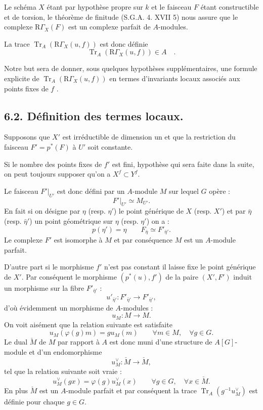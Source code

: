 \documentclass[11pt]{article}
\newcommand{\R}{\mathrm{R}}\newcommand{\RHomCore}{\mathrm{RHom}}
\providecommand{\Tr}{\operatorname{Tr}}
\providecommand{\Tr}{\operatorname{Tr}}
\providecommand{\Tr}{\operatorname{Tr}}
\providecommand{\R}{\mathrm R}
\providecommand{\Tr}{\operatorname{Tr}}
\providecommand{\Tr}{\operatorname{Tr}}
\begin{document}
Le schéma $X$ étant par hypothèse propre sur $k$ et le faisceau $F$ étant constructible et de torsion, le théorème de finitude (S.G.A. 4. XVII 5) nous assure que le complexe $\R\Gamma_X(F)$ est un complexe parfait de $A$-modules.

La trace $\Tr_A(\R\Gamma_X(u, f))$ est donc définie
\[
\Tr_A(\R\Gamma_X(u, f)) \in A \quad .
\]

Notre but sera de donner, sous quelques hypothèses supplémentaires, une formule explicite de $\Tr_A(\R\Gamma_X(u, f))$ en termes d'invariants locaux associés aux points fixes de $f$ .

\bigskip

\subsection*{6.2. Définition des termes locaux.}
Supposons que $X'$ est irréductible de dimension un et que la restriction du faisceau $F'=p^*(F)$ à $U'$ soit constante.

Si le nombre des points fixes de $f'$ est fini, hypothèse qui sera faite dans la suite, on peut toujours supposer qu'on a $X^f \subset Y^f$.

Le faisceau $F'|_{U'}$ est donc défini par un $A$-module $M$ sur lequel $G$ opère :
\[
F'|_{U'} \simeq M_{U'} .
\]
En fait si on désigne par $\eta$ (resp. $\eta'$) le point générique de $X$ (resp. $X'$) et par $\bar\eta$ (resp. $\bar\eta'$) un point géométrique sur $\eta$ (resp. $\eta'$) on a :
\[
p(\eta')=\eta\qquad F_{\bar\eta} \simeq F'_{\bar\eta'} .
\]
Le complexe $F'$ est isomorphe à $M$ et par conséquence $M$ est un $A$-module parfait.

D'autre part si le morphisme $f'$ n'est pas constant il laisse fixe le point générique de $X'$. Par conséquent le morphisme $(p^*(u),f')$ de la paire $(X',F')$ induit un morphisme sur la fibre $F'_{\bar\eta'}$ :
\[
u'_{\bar\eta'}:F'_{\bar\eta'}\longrightarrow F'_{\bar\eta'} ,
\]
d'où évidemment un morphisme de $A$-modules :
\[
u_M:M\longrightarrow M .
\]
On
voit aisément que la relation suivante est satisfaite
\begin{equation}\tag{6.2.1}
u_M(\varphi(g)m)=g u_M(m) \qquad \forall m\in M,\quad \forall g\in G .
\end{equation}
Le dual $\check{M}$ de $M$ par rapport à $A$ est donc muni d'une structure de $A[G]$-module et d'un endomorphisme
\[
u_M^\vee:\check{M}\longrightarrow \check{M} ,
\]
tel que la relation suivante soit vraie :
\[
u_M^\vee(gx)=\varphi(g)u_M^\vee(x) \qquad \forall g\in G,\quad \forall x\in \check{M} .
\]
En plus $\check{M}$ est un $A$-module parfait et par conséquent la trace $\Tr_A(g^{-1}u_M^\vee)$ est définie pour chaque $g\in G$.
\end{document}
